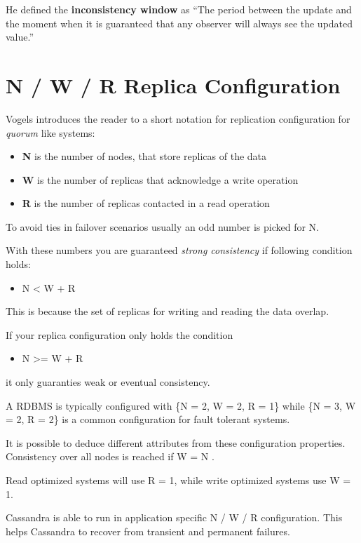 \documentclass{llncs}
\begin{document}
He defined the \textbf{inconsistency window} as
``The period between the update and the moment when it is guaranteed that any observer will always see the updated value.''

\section{N / W / R Replica Configuration}

Vogels introduces the reader to a short notation for replication
configuration for \emph{quorum} like systems:

\begin{itemize}
\item
  \textbf{N} is the number of nodes, that store replicas of the data
\item
  \textbf{W} is the number of replicas that acknowledge a write
  operation
\item
  \textbf{R} is the number of replicas contacted in a read operation
\end{itemize}
To avoid ties in failover scenarios usually an odd number is picked
for N.

With these numbers you are guaranteed \emph{strong consistency} if
following condition holds:

\begin{itemize}
\item
  N \textless{} W + R
\end{itemize}
This is because the set of replicas for writing and reading the
data overlap.

If your replica configuration only holds the condition

\begin{itemize}
\item
  N \textgreater{}= W + R
\end{itemize}
it only guaranties weak or eventual consistency.

A RDBMS is typically configured with \{N = 2, W = 2, R = 1\} while
\{N = 3, W = 2, R = 2\} is a common configuration for fault
tolerant systems.

It is possible to deduce different attributes from these
configuration properties. Consistency over all nodes is reached if
W = N .

Read optimized systems will use R = 1, while write optimized
systems use W = 1.

Cassandra is able to run in application specific N / W / R
configuration. This helps Cassandra to recover from transient and
permanent failures.
\end{document}

